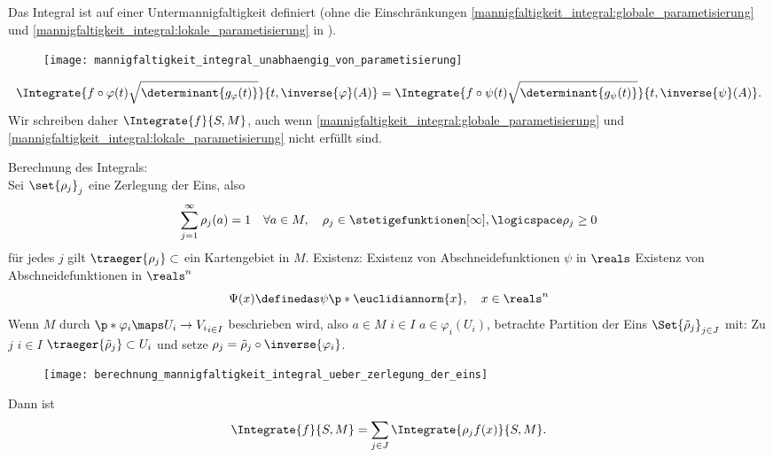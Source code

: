 \begin{folgerung}\label{berechnung_mannigfaltigkeit_integral_ueber_zerlegung_der_eins}
  Das Integral ist auf einer Untermannigfaltigkeit definiert (ohne die Einschränkungen \ref{mannigfaltigkeit_integral:globale_parametisierung} und \ref{mannigfaltigkeit_integral:lokale_parametisierung} in ).
  \begin{figure}[H]
    \centering
    \texttt{[image: mannigfaltigkeit\_integral\_unabhaengig\_von\_parametisierung]}
    \label{fig:mannigfaltigkeit_integral_unabhaengig_von_parametisierung}
  \end{figure}
  \begin{equation*}
    \Integrate{f\circ \varphi(t)\sqrt{\determinant{g_{\varphi}(t)}}}{t,\inverse{\varphi}(A)}=\Integrate{f\circ \psi(t)\sqrt{\determinant{g_{\psi}(t)}}}{t,\inverse{\psi}(A)}.
  \end{equation*}
  Wir schreiben daher \( \Integrate{f}{S,M} \), auch wenn \ref{mannigfaltigkeit_integral:globale_parametisierung} und \ref{mannigfaltigkeit_integral:lokale_parametisierung} nicht erfüllt sind. 

  Berechnung des Integrals:\\
  Sei \( \set{\rho_j}_j \) eine Zerlegung der Eins, also
  \begin{equation*}
    \sum_{j=1}^{\infty}\rho_j(a)=1 \quad \forall a\in M,\quad \rho_j\in \stetigefunktionen[\infty], \logicspace\rho_j\geq 0
  \end{equation*}
  \sd für jedes \( j \) gilt \( \traeger{ \rho_j}\subset  \) ein Kartengebiet in \( M \).
  Existenz: Existenz von Abschneidefunktionen \( \psi \) in \( \reals \) \timplies Existenz von Abschneidefunktionen in \( \reals^n \)
  \begin{equation}
    \Psi(x)\definedas \psi\p*{\euclidiannorm{x}},\quad x\in \reals^n
  \end{equation}
  \timplies Wenn \( M \) durch 
  \( \p*{\varphi_i\maps U_i\to V_i}_{i\in I} \)
   beschrieben wird,
    also \tforall \( a\in M \) \texists \( i\in I \) \sd \( a\in \varphi_i(U_i) \), betrachte Partition der Eins \( \Set{\tilde{\rho}_j}_{j\in J} \) mit: Zu \( j \) \texists \( i\in I \) \sd \( \traeger{\tilde{\rho}_j}\subset U_i \) und setze \( \rho_j=\tilde{\rho}_j\circ \inverse{\varphi_i} \).
  \begin{figure}[H]
    \centering
    \texttt{[image: berechnung\_mannigfaltigkeit\_integral\_ueber\_zerlegung\_der\_eins]}
    \label{fig:berechnung_mannigfaltigkeit_integral_ueber_zerlegung_der_eins}
  \end{figure}
  Dann ist 
  \begin{equation*}
    \Integrate{f}{S,M}=\sum_{j\in J} \Integrate{\rho_j f(x)}{S,M}.
  \end{equation*}
\end{folgerung}
